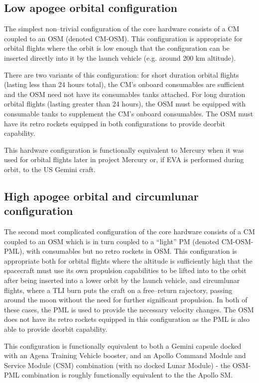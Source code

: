 \documentclass{report}
\begin{document}
\subsection{Low apogee orbital configuration}

The simplest non--trivial configuration of the core hardware consists of a CM coupled to an OSM (denoted CM-OSM).  This configuration is appropriate for orbital flights where the orbit is low enough that the configuration can be inserted directly into it by the launch vehicle (e.g. around 200 km altitude).

There are two variants of this configuration: for short duration orbital flights (lasting less than 24 hours total), the CM's onboard consumables are sufficient and the OSM need not have its consumables tanks attached.  For long duration orbital flights (lasting greater than 24 hours), the OSM must be equipped with consumable tanks to supplement the CM's onboard consumables.  The OSM must have its retro rockets equipped in both configurations to provide deorbit capability.

This hardware configuration is functionally equivalent to Mercury when it was used for orbital flights later in project Mercury or, if EVA is performed during orbit, to the US Gemini craft.

\subsection{High apogee orbital and circumlunar configuration}

The second most complicated configuration of the core hardware consists of a CM coupled to an OSM which is in turn coupled to a ``light'' PM (denoted CM-OSM-PML), with consumables but no retro rockets in OSM.  This configuration is appropriate both for orbital flights where the altitude is sufficiently high that the spacecraft must use its own propulsion capabilities to be lifted into to the orbit after being inserted into a lower orbit by the launch vehicle, and circumlunar flights, where a TLI burn puts the craft on a free--return rajectory, passing around the moon without the need for further significant propulsion.  In both of these cases, the PML is used to provide the necessary velocity changes.  The OSM does not have its retro rockets equipped in this configuration as the PML is also able to provide deorbit capability.

This configuration is functionally equivalent to both a Gemini capsule docked with an Agena Training Vehicle booster, and an Apollo Command Module and Service Module (CSM) combination (with no docked Lunar Module) - the OSM-PML combination is roughly functionally equivalent to the the Apollo SM.
\end{document}
